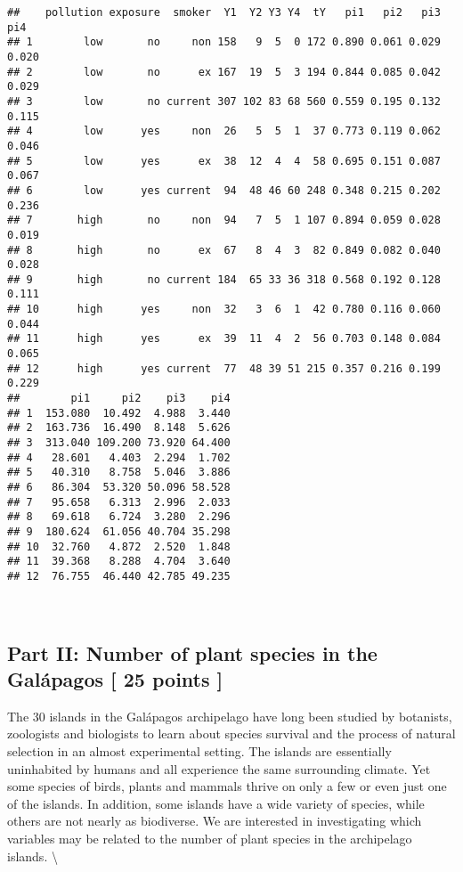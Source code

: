 \documentclass[]{article}
\begin{document}
\begin{verbatim}
##    pollution exposure  smoker  Y1  Y2 Y3 Y4  tY   pi1   pi2   pi3   pi4
## 1        low       no     non 158   9  5  0 172 0.890 0.061 0.029 0.020
## 2        low       no      ex 167  19  5  3 194 0.844 0.085 0.042 0.029
## 3        low       no current 307 102 83 68 560 0.559 0.195 0.132 0.115
## 4        low      yes     non  26   5  5  1  37 0.773 0.119 0.062 0.046
## 5        low      yes      ex  38  12  4  4  58 0.695 0.151 0.087 0.067
## 6        low      yes current  94  48 46 60 248 0.348 0.215 0.202 0.236
## 7       high       no     non  94   7  5  1 107 0.894 0.059 0.028 0.019
## 8       high       no      ex  67   8  4  3  82 0.849 0.082 0.040 0.028
## 9       high       no current 184  65 33 36 318 0.568 0.192 0.128 0.111
## 10      high      yes     non  32   3  6  1  42 0.780 0.116 0.060 0.044
## 11      high      yes      ex  39  11  4  2  56 0.703 0.148 0.084 0.065
## 12      high      yes current  77  48 39 51 215 0.357 0.216 0.199 0.229
##        pi1     pi2    pi3    pi4
## 1  153.080  10.492  4.988  3.440
## 2  163.736  16.490  8.148  5.626
## 3  313.040 109.200 73.920 64.400
## 4   28.601   4.403  2.294  1.702
## 5   40.310   8.758  5.046  3.886
## 6   86.304  53.320 50.096 58.528
## 7   95.658   6.313  2.996  2.033
## 8   69.618   6.724  3.280  2.296
## 9  180.624  61.056 40.704 35.298
## 10  32.760   4.872  2.520  1.848
## 11  39.368   8.288  4.704  3.640
## 12  76.755  46.440 42.785 49.235
\end{verbatim}

~

\newpage

\subsection*{Part II:  Number of plant species in the Galápagos [ 25 points ] }

The 30 islands in the Galápagos archipelago have long been studied by
botanists, zoologists and biologists to learn about species survival and
the process of natural selection in an almost experimental setting. The
islands are essentially uninhabited by humans and all experience the
same surrounding climate. Yet some species of birds, plants and mammals
thrive on only a few or even just one of the islands. In addition, some
islands have a wide variety of species, while others are not nearly as
biodiverse. We are interested in investigating which variables may be
related to the number of plant species in the archipelago islands.
\textbackslash{}
\end{document}
